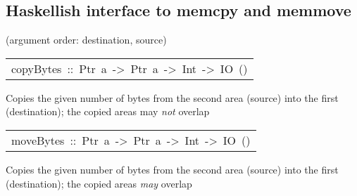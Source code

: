\subsection{Haskellish interface to memcpy and memmove
}
(argument order: destination, source)
\par

\begin{haddockdesc}
\item[\begin{tabular}{@{}l}
copyBytes\ ::\ Ptr\ a\ ->\ Ptr\ a\ ->\ Int\ ->\ IO\ ()
\end{tabular}]\haddockbegindoc
Copies the given number of bytes from the second area (source) into the
 first (destination); the copied areas may \emph{not} overlap
\par

\end{haddockdesc}
\begin{haddockdesc}
\item[\begin{tabular}{@{}l}
moveBytes\ ::\ Ptr\ a\ ->\ Ptr\ a\ ->\ Int\ ->\ IO\ ()
\end{tabular}]\haddockbegindoc
Copies the given number of bytes from the second area (source) into the
 first (destination); the copied areas \emph{may} overlap
\par

\end{haddockdesc}